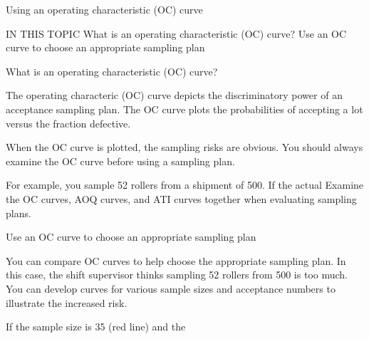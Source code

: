 
Using an operating characteristic (OC) curve

IN THIS TOPIC
What is an operating characteristic (OC) curve?
Use an OC curve to choose an appropriate sampling plan


What is an operating characteristic (OC) curve?

The operating characteric (OC) curve depicts the discriminatory power of an acceptance sampling plan. The OC curve plots the probabilities of accepting a lot versus the fraction defective.

When the OC curve is plotted, the sampling risks are obvious. You should always examine the OC curve before using a sampling plan.

For example, you sample 52 rollers from a shipment of 500. If the actual %
Examine the OC curves, AOQ curves, and ATI curves together when evaluating sampling plans.

Use an OC curve to choose an appropriate sampling plan

You can compare OC curves to help choose the appropriate sampling plan. In this case, the shift supervisor thinks sampling 52 rollers from 500 is too much. You can develop curves for various sample sizes and acceptance numbers to illustrate the increased risk.

If the sample size is 35 (red line) and the %


